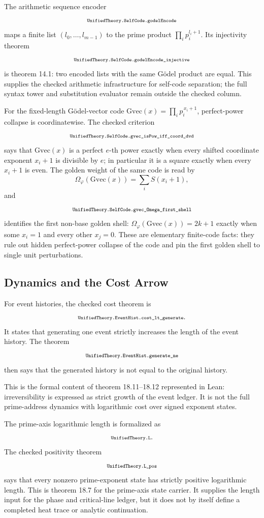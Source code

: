 \documentclass[11pt]{article}
\newcommand{\lean}[1]{\relax\ifmmode\hbox{\scriptsize\ttfamily\detokenize{#1}}\else{\small\texttt{\detokenize{#1}}}\fi}
\begin{document}
The arithmetic sequence encoder
$$
  \lean{UnifiedTheory.SelfCode.godelEncode}
$$
maps a finite list $(l_0,\ldots,l_{m-1})$ to the prime product $\prod_i p_i^{l_i+1}$.  Its injectivity theorem
$$
  \lean{UnifiedTheory.SelfCode.godelEncode_injective}
$$
is theorem 14.1: two encoded lists with the same Gödel product are equal.  This supplies the checked arithmetic infrastructure for self-code separation; the full syntax tower and substitution evaluator remain outside the checked column.

For the fixed-length Gödel-vector code $\mathrm{Gvec}(x)=\prod_i p_i^{\,x_i+1}$, perfect-power collapse is coordinatewise.  The checked criterion
$$
  \lean{UnifiedTheory.SelfCode.gvec_isPow_iff_coord_dvd}
$$
says that $\mathrm{Gvec}(x)$ is a perfect $e$-th power exactly when every shifted coordinate exponent $x_i+1$ is divisible by $e$; in particular it is a square exactly when every $x_i+1$ is even.  The golden weight of the same code is read by
$$
  \Omega_\varphi(\mathrm{Gvec}(x))=\sum_i S(x_i+1),
$$
and
$$
  \lean{UnifiedTheory.SelfCode.gvec_Omega_first_shell}
$$
identifies the first non-base golden shell: $\Omega_\varphi(\mathrm{Gvec}(x))=2k+1$ exactly when some $x_i=1$ and every other $x_j=0$.  These are elementary finite-code facts: they rule out hidden perfect-power collapse of the code and pin the first golden shell to single unit perturbations.

\subsection{Dynamics and the Cost Arrow}

For event histories, the checked cost theorem is
$$
  \lean{UnifiedTheory.EventHist.cost_lt_generate}.
$$
It states that generating one event strictly increases the length of the event history.  The theorem
$$
  \lean{UnifiedTheory.EventHist.generate_ne}
$$
then says that the generated history is not equal to the original history.

This is the formal content of theorem 18.11--18.12 represented in Lean: irreversibility is expressed as strict growth of the event ledger.  It is not the full prime-address dynamics with logarithmic cost over signed exponent states.

The prime-axis logarithmic length is formalized as
$$
  \lean{UnifiedTheory.L}.
$$
The checked positivity theorem
$$
  \lean{UnifiedTheory.L_pos}
$$
says that every nonzero prime-exponent state has strictly positive logarithmic length.  This is theorem 18.7 for the prime-axis state carrier.  It supplies the length input for the phase and critical-line ledger, but it does not by itself define a completed heat trace or analytic continuation.
\end{document}
